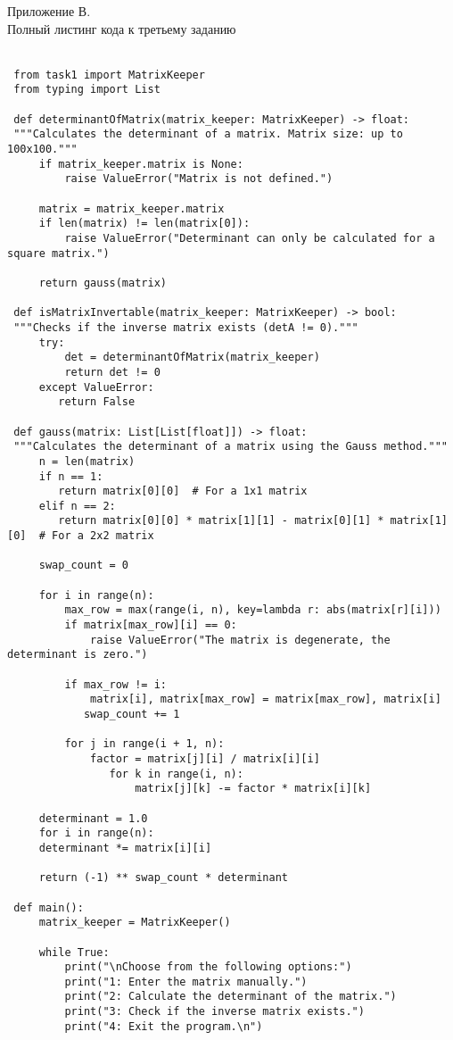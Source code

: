 \centering\begin{large}
	{Приложение В.\\
		Полный листинг кода к третьему заданию}\\ \\
\end{large}
 \begin{lstlisting}
 from task1 import MatrixKeeper
 from typing import List
 
 def determinantOfMatrix(matrix_keeper: MatrixKeeper) -> float:
 """Calculates the determinant of a matrix. Matrix size: up to 100x100."""
	 if matrix_keeper.matrix is None:
		 raise ValueError("Matrix is not defined.")
	 
	 matrix = matrix_keeper.matrix
	 if len(matrix) != len(matrix[0]):
		 raise ValueError("Determinant can only be calculated for a square matrix.")
	 
	 return gauss(matrix)
	 
 def isMatrixInvertable(matrix_keeper: MatrixKeeper) -> bool:
 """Checks if the inverse matrix exists (detA != 0)."""
	 try:
		 det = determinantOfMatrix(matrix_keeper)
		 return det != 0
	 except ValueError:
	 	return False
 
 def gauss(matrix: List[List[float]]) -> float:
 """Calculates the determinant of a matrix using the Gauss method."""
	 n = len(matrix)
	 if n == 1:
	 	return matrix[0][0]  # For a 1x1 matrix
	 elif n == 2:
	 	return matrix[0][0] * matrix[1][1] - matrix[0][1] * matrix[1][0]  # For a 2x2 matrix
	 
	 swap_count = 0
	 
	 for i in range(n):
		 max_row = max(range(i, n), key=lambda r: abs(matrix[r][i]))
		 if matrix[max_row][i] == 0:
			 raise ValueError("The matrix is degenerate, the determinant is zero.")
	 
		 if max_row != i:
			 matrix[i], matrix[max_row] = matrix[max_row], matrix[i]
		 	swap_count += 1
		 
		 for j in range(i + 1, n):
			 factor = matrix[j][i] / matrix[i][i]
		 		for k in range(i, n):
		 			matrix[j][k] -= factor * matrix[i][k]
	 
	 determinant = 1.0
	 for i in range(n):
	 determinant *= matrix[i][i]
	 
	 return (-1) ** swap_count * determinant
 
 def main():
	 matrix_keeper = MatrixKeeper()
	 
	 while True:
		 print("\nChoose from the following options:")
		 print("1: Enter the matrix manually.")
		 print("2: Calculate the determinant of the matrix.")
		 print("3: Check if the inverse matrix exists.")
		 print("4: Exit the program.\n")
		 

\end{lstlisting}
